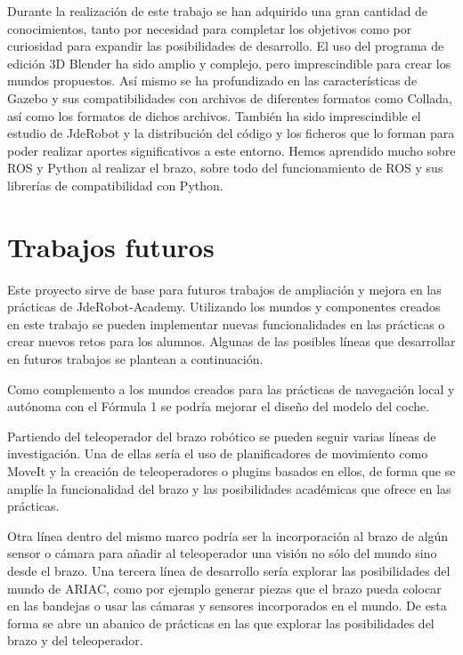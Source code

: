 Durante la realización de este trabajo se han adquirido una gran cantidad de conocimientos, tanto por necesidad para completar los objetivos como por curiosidad para expandir las posibilidades de desarrollo. El uso del programa de edición 3D Blender ha sido amplio y complejo, pero imprescindible para crear los mundos propuestos. Así mismo se ha profundizado en las características de Gazebo y sus compatibilidades con archivos de diferentes formatos como Collada, así como los formatos de dichos archivos. También ha sido imprescindible el estudio de JdeRobot y la distribución del código y los ficheros que lo forman para poder realizar aportes significativos a este entorno. Hemos aprendido mucho sobre ROS y Python al realizar el brazo, sobre todo del funcionamiento de ROS y sus librerías de compatibilidad con Python.


\section{Trabajos futuros}
\label{sec:cn_trabajosfuturos}

Este proyecto sirve de base para futuros trabajos de ampliación y mejora en las prácticas de JdeRobot-Academy. Utilizando los mundos y componentes creados en este trabajo se pueden implementar nuevas funcionalidades en las prácticas o crear nuevos retos para los alumnos. Algunas de las posibles líneas que desarrollar en futuros trabajos se plantean a continuación.

Como complemento a los mundos creados para las prácticas de navegación local y autónoma con el Fórmula 1 se podría mejorar el diseño del modelo del coche. 

Partiendo del teleoperador del brazo robótico se pueden seguir varias líneas de investigación. Una de ellas sería el uso de planificadores de movimiento como MoveIt y la creación de teleoperadores o plugins basados en ellos, de forma que se amplíe la funcionalidad del brazo y las posibilidades académicas que ofrece en las prácticas. 

Otra línea dentro del mismo marco podría ser la incorporación al brazo de algún sensor o cámara para añadir al teleoperador una visión no sólo del mundo sino desde el brazo. Una tercera línea de desarrollo sería explorar las posibilidades del mundo de ARIAC, como por ejemplo generar piezas que el brazo pueda colocar en las bandejas o usar las cámaras y sensores incorporados en el mundo. De esta forma se abre un abanico de prácticas en las que explorar las posibilidades del brazo y del teleoperador.


